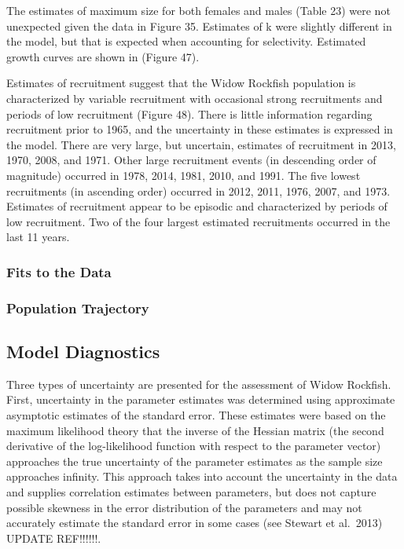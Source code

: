 \documentclass[
]{scrartcl}
\begin{document}
The estimates of maximum size for both females and males (Table 23) were
not unexpected given the data in Figure 35. Estimates of k were slightly
different in the model, but that is expected when accounting for
selectivity. Estimated growth curves are shown in (Figure 47).

Estimates of recruitment suggest that the Widow Rockfish population is
characterized by variable recruitment with occasional strong
recruitments and periods of low recruitment (Figure 48). There is little
information regarding recruitment prior to 1965, and the uncertainty in
these estimates is expressed in the model. There are very large, but
uncertain, estimates of recruitment in 2013, 1970, 2008, and 1971. Other
large recruitment events (in descending order of magnitude) occurred in
1978, 2014, 1981, 2010, and 1991. The five lowest recruitments (in
ascending order) occurred in 2012, 2011, 1976, 2007, and 1973. Estimates
of recruitment appear to be episodic and characterized by periods of low
recruitment. Two of the four largest estimated recruitments occurred in
the last 11 years.

\subsubsection{Fits to the Data}\label{fits-to-the-data}

\subsubsection{Population Trajectory}\label{population-trajectory}

\subsection{Model Diagnostics}\label{model-diagnostics}

Three types of uncertainty are presented for the assessment of Widow
Rockfish. First, uncertainty in the parameter estimates was determined
using approximate asymptotic estimates of the standard error. These
estimates were based on the maximum likelihood theory that the inverse
of the Hessian matrix (the second derivative of the log-likelihood
function with respect to the parameter vector) approaches the true
uncertainty of the parameter estimates as the sample size approaches
infinity. This approach takes into account the uncertainty in the data
and supplies correlation estimates between parameters, but does not
capture possible skewness in the error distribution of the parameters
and may not accurately estimate the standard error in some cases (see
Stewart et al.~2013) UPDATE REF!!!!!!.
\end{document}
